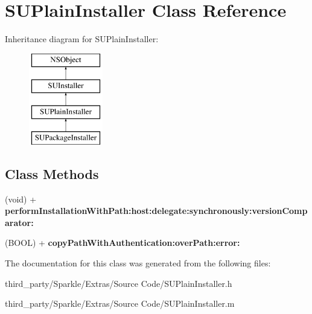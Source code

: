 \hypertarget{interface_s_u_plain_installer}{}\section{S\+U\+Plain\+Installer Class Reference}
\label{interface_s_u_plain_installer}
Inheritance diagram for S\+U\+Plain\+Installer\+:\begin{figure}[H]
\begin{center}
\leavevmode
\includegraphics[height=4.000000cm]{interface_s_u_plain_installer}
\end{center}
\end{figure}
\subsection*{Class Methods}
\begin{DoxyCompactItemize}
\item 
\mbox{\label{interface_s_u_plain_installer_a43754c5fae831d36daf4649d1ed991e5}} 
(void) + {\bfseries perform\+Installation\+With\+Path\+:host\+:delegate\+:synchronously\+:version\+Comparator\+:}
\item 
\mbox{\label{interface_s_u_plain_installer_a121d72169fe38b8b72630cd173478aa7}} 
(B\+O\+OL) + {\bfseries copy\+Path\+With\+Authentication\+:over\+Path\+:error\+:}
\end{DoxyCompactItemize}


The documentation for this class was generated from the following files\+:\begin{DoxyCompactItemize}
\item 
third\+\_\+party/\+Sparkle/\+Extras/\+Source Code/S\+U\+Plain\+Installer.\+h\item 
third\+\_\+party/\+Sparkle/\+Extras/\+Source Code/S\+U\+Plain\+Installer.\+m\end{DoxyCompactItemize}
